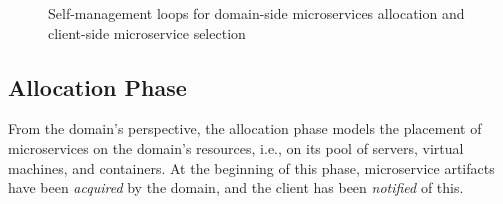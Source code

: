 
\begin{figure}[thbp]
	\centering
	\captionsetup[subfigure]{width=0.4\textwidth}	
	\null\hfill
	\captionsetup[subfigure]{width=0.4\textwidth}	
	\hfill
	\hfill\null
	\caption{Self-management loops for domain-side microservices allocation and client-side microservice selection}\label{fig:allocation-loops}
\end{figure}

\subsection{Allocation Phase}\label{sec:A3-E-allocation}

From the domain's perspective, the allocation phase models the placement of microservices on the domain's resources, i.e., on its pool of servers, virtual machines, and containers. At the beginning of this phase, microservice artifacts have been \textit{acquired} by the domain, and the client has been \textit{notified} of this.

